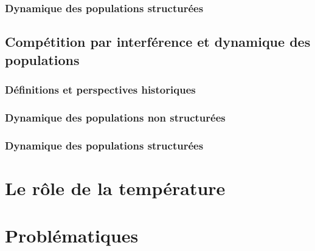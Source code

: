 \subsubsection{Dynamique des populations structurées}

\subsection{Compétition par interférence et dynamique des populations}

\subsubsection{Définitions et perspectives historiques}

\subsubsection{Dynamique des populations non structurées}

\subsubsection{Dynamique des populations structurées}





\section{Le rôle de la température}

\section{Problématiques}	
